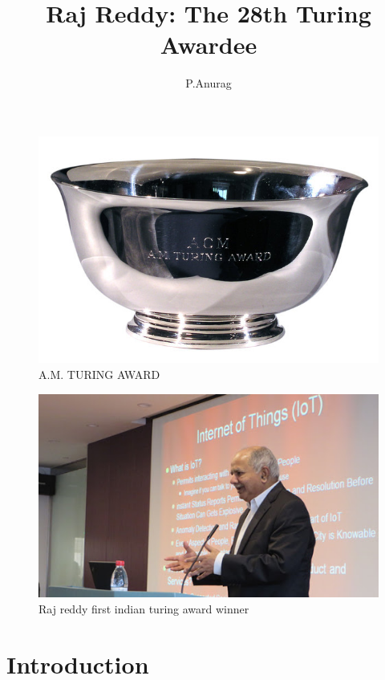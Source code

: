 \documentclass[a4paper,10pt]{article}
\title{Raj Reddy: The 28th Turing Awardee}
\author{P.Anurag}
\begin{document}
\maketitle

\begin{figure}[!hbt]
 \centering
 \includegraphics[scale=0.65]{turing_bowl.jpg}
 \caption{A.M. TURING AWARD}
\end{figure}
\newpage

\tableofcontents

\begin{figure}[!htb]
 \centering
 \includegraphics[scale=0.75]{raj1.jpg}
 \caption{Raj reddy first indian turing award winner}
\end{figure}


\newpage
  
\section{Introduction}
\end{document}
